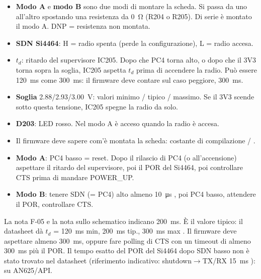 \begin{nota}
\begin{itemize}
\item \textbf{Modo A} e \textbf{modo B} sono due modi di montare la scheda. Si passa da uno all'altro spostando una resistenza da \SI{0}{\ohm} (R204 o R205). Di serie è montato il modo A. DNP = resistenza non montata.
\item \textbf{SDN Si4464}: H = radio spenta (perde la configurazione), L = radio accesa.
\item \textbf{$t_d$}: ritardo del supervisore IC205. Dopo che PC4 torna alto, o dopo che il 3V3 torna sopra la soglia, IC205 aspetta $t_d$ prima di accendere la radio. Può essere \SI{120}{\milli\second} come \SI{300}{\milli\second}: il firmware deve contare sul caso peggiore, \SI{300}{\milli\second}.
\item \textbf{Soglia} \SI{2.88}{}/\SI{2.93}{}/\SI{3.00}{\volt}: valori minimo / tipico / massimo. Se il 3V3 scende sotto questa tensione, IC205 spegne la radio da solo.
\item \textbf{D203}: LED rosso. Nel modo A è acceso quando la radio è accesa.
\end{itemize}
\end{nota}

\begin{regola}
\begin{itemize}
\item Il firmware deve sapere com'è montata la scheda: costante di compilazione  /  .
\item \textbf{Modo A}: PC4 basso = reset. Dopo il rilascio di PC4 (o all'accensione) aspettare il ritardo del supervisore, poi il POR del Si4464, poi controllare CTS prima di mandare POWER\_UP.
\item \textbf{Modo B}: tenere SDN (= PC4) alto almeno \SI{10}{\micro\second} , poi PC4 basso, attendere il POR, controllare CTS.
\end{itemize}
\end{regola}

\begin{verifica}
La nota F-05 e la nota sullo schematico indicano \SI{200}{\milli\second}. È il valore tipico: il datasheet dà $t_d$ = \SI{120}{\milli\second} min, \SI{200}{\milli\second} tip., \SI{300}{\milli\second} max . Il firmware deve aspettare almeno \SI{300}{\milli\second}, oppure fare polling di CTS con un timeout di almeno \SI{300}{\milli\second} più il POR. Il tempo esatto del POR del Si4464 dopo SDN basso non è stato trovato nel datasheet (riferimento indicativo: shutdown$\to$TX/RX \SI{15}{\milli\second} ): \DV{} su AN625/API.
\end{verifica}

